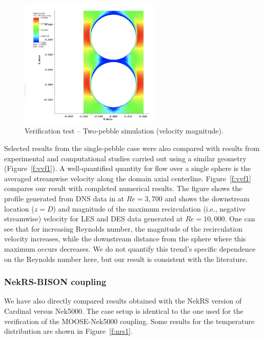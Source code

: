 \begin{figure}[!h]
\centering
\includegraphics[clip=true,width=0.6\textwidth]{Figures/pb_vv2}
\caption{Verification test -- Two-pebble simulation (velocity magnitude).}
\label{f:vvf2}
\end{figure}

Selected results from the single-pebble case were also compared with results from experimental and computational studies carried out using a similar geometry (Figure~\ref{f:vvf1}). A well-quantified quantity for flow over a single sphere is the averaged streamwise velocity along the domain axial centerline. Figure~\ref{f:vvf1} compares our result with completed numerical results. The figure shows the profile generated from DNS data in \cite{fick2017investigation} at $Re = 3,700$ and shows the downstream location ($z=D$) and magnitude of the maximum recirculation (i.e., negative streamwise) velocity for LES and DES data generated at $Re = 10,000$. One can see that for increasing Reynolds number, the magnitude of the recirculation velocity increases, while the downstream distance from the sphere where this maximum occurs decreases. We do not quantify this trend's specific dependence on the Reynolds number here, but our result is consistent with the literature.

\subsubsection{NekRS-BISON coupling}

We have also directly compared results obtained with the NekRS version of Cardinal versus Nek5000. The case setup is identical to the one used for the verification of the MOOSE-Nek5000 coupling. Some results for the temperature distribution are shown in Figure~\ref{f:nrs1}.

